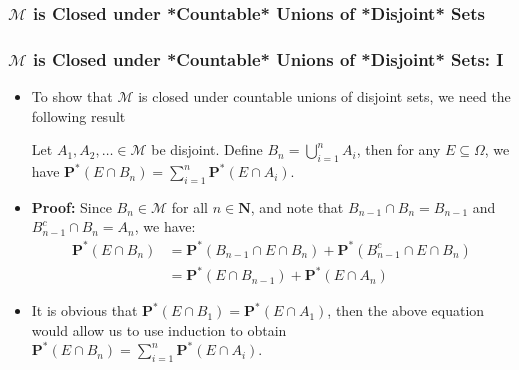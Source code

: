 \documentclass[handout]{beamer}
\newcommand{\BP}{\mathbf{P}}
\begin{document}
\subsubsection{$\mathcal{M}$ is Closed under *Countable* Unions of *Disjoint* Sets}
\frame
{
  \frametitle{$\mathcal{M}$ is Closed under *Countable* Unions of *Disjoint* Sets: I}

   \begin{itemize}

            \item<1->  To show that $\mathcal{M}$ is closed under countable unions of disjoint sets, we need the following result
\begin{Lemma}[2.3.11] Let $A_1, A_2,\ldots \in \mathcal{M}$ be disjoint. Define $B_n=\bigcup_{i=1}^n A_i$, then for any $E\subseteq \Omega$, we have 
             $\BP^*(E\cap B_n)=\sum_{i=1}^n \BP^* (E\cap A_i)$. \end{Lemma}    
       
              \item<2-> []\textbf{Proof:} Since $B_n\in \mathcal{M}$ for all $n\in \mathbf{N}$, and note that $B_{n-1}\cap B_n=B_{n-1}$ and $B_{n-1}^c\cap B_n=A_{n}$, we have:
             \begin{align*} \BP^*( E\cap B_n)& = \BP^*( B_{n-1}\cap E\cap B_n)+ \BP^*( B_{n-1}^c \cap E\cap B_n) \\ 
             &= \BP^*( E\cap B_{n-1})+ \BP^*(  E\cap A_n)             \end{align*}
                 
              \item<3-> [] It is obvious that $\BP^*( E\cap B_1)=\BP^*( E\cap A_1)$, then the above equation would allow us to use induction to obtain $\BP^*(E\cap B_n)=\sum_{i=1}^n \BP^* (E\cap A_i)$.
             
             
                 \end{itemize}
}
\end{document}
